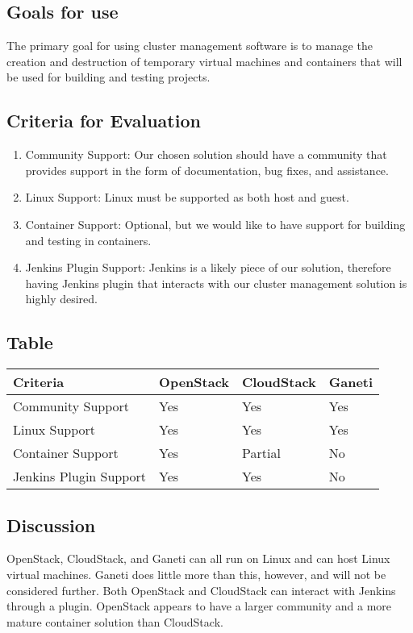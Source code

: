 \documentclass[10pt,letterpaper,onecolumn,journal]{IEEEtran}
\begin{document}
\subsection{Goals for use}
The primary goal for using cluster management software is to manage the creation and destruction of temporary virtual machines and containers that will be used for building and testing projects.
\subsection{Criteria for Evaluation}
\begin{enumerate}
  \item Community Support: Our chosen solution should have a community that provides support in the form of documentation, bug fixes, and assistance.
  \item Linux Support: Linux must be supported as both host and guest.
  \item Container Support: Optional, but we would like to have support for building and testing in containers.
  \item Jenkins Plugin Support: Jenkins is a likely piece of our solution, therefore having Jenkins plugin that interacts with our cluster management solution is highly desired.
\end{enumerate}
\subsection{Table}
\begin{center}
  \begin{tabular}{llll}
    Criteria & OpenStack & CloudStack & Ganeti \\ \midrule
    Community Support       & Yes & Yes & Yes \\ \midrule
    Linux Support           & Yes & Yes & Yes \\ \midrule
    Container Support       & Yes & Partial & No \\ \midrule
    Jenkins Plugin Support  & Yes & Yes & No \\ \bottomrule
  \end{tabular}
\end{center}
\subsection{Discussion}
OpenStack, CloudStack, and Ganeti can all run on Linux and can host Linux virtual machines.
Ganeti does little more than this, however, and will not be considered further.
Both OpenStack and CloudStack can interact with Jenkins through a plugin.
OpenStack appears to have a larger community and a more mature container solution than CloudStack.
\end{document}
